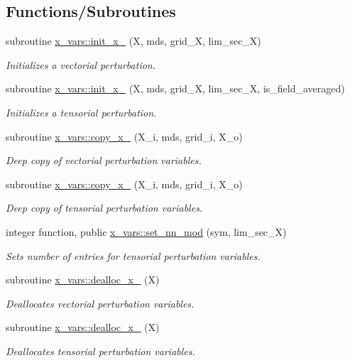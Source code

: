 \subsection*{Functions/\+Subroutines}
\begin{DoxyCompactItemize}
\item 
subroutine \hyperlink{namespacex__vars_a327c74a0fa8c50aa2ed812062bd82436}{x\+\_\+vars\+::init\+\_\+x\+\_} (X, mds, grid\+\_\+X, lim\+\_\+sec\+\_\+X)
\begin{DoxyCompactList}\small\item\em Initializes a vectorial perturbation. \end{DoxyCompactList}\item 
subroutine \hyperlink{namespacex__vars_a5cb61bfd7fbdae7bae2ec10b63160d74}{x\+\_\+vars\+::init\+\_\+x\+\_} (X, mds, grid\+\_\+X, lim\+\_\+sec\+\_\+X, is\+\_\+field\+\_\+averaged)
\begin{DoxyCompactList}\small\item\em Initializes a tensorial perturbation. \end{DoxyCompactList}\item 
subroutine \hyperlink{namespacex__vars_ae9744cbf1a4fc06080517a03ac43b960}{x\+\_\+vars\+::copy\+\_\+x\+\_} (X\+\_\+i, mds, grid\+\_\+i, X\+\_\+o)
\begin{DoxyCompactList}\small\item\em Deep copy of vectorial perturbation variables. \end{DoxyCompactList}\item 
subroutine \hyperlink{namespacex__vars_aeaa25b69e4ef9cc5882c9dcf894201d7}{x\+\_\+vars\+::copy\+\_\+x\+\_} (X\+\_\+i, mds, grid\+\_\+i, X\+\_\+o)
\begin{DoxyCompactList}\small\item\em Deep copy of tensorial perturbation variables. \end{DoxyCompactList}\item 
integer function, public \hyperlink{namespacex__vars_a90d744aee4358a8cc35d29304d1bb120}{x\+\_\+vars\+::set\+\_\+nn\+\_\+mod} (sym, lim\+\_\+sec\+\_\+X)
\begin{DoxyCompactList}\small\item\em Sets number of entries for tensorial perturbation variables. \end{DoxyCompactList}\item 
subroutine \hyperlink{namespacex__vars_a20679fb70a3dbfcdf2479b1219b847d1}{x\+\_\+vars\+::dealloc\+\_\+x\+\_} (X)
\begin{DoxyCompactList}\small\item\em Deallocates vectorial perturbation variables. \end{DoxyCompactList}\item 
subroutine \hyperlink{namespacex__vars_ac052defbe764e6d02f436bd29d72db6d}{x\+\_\+vars\+::dealloc\+\_\+x\+\_} (X)
\begin{DoxyCompactList}\small\item\em Deallocates tensorial perturbation variables. \end{DoxyCompactList}\end{DoxyCompactItemize}
